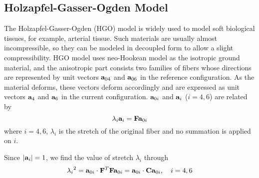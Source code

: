 \subsection{Holzapfel-Gasser-Ogden Model}
The Holzapfel-Gasser-Ogden (HGO) model is widely used to model soft biological tissues, for example, arterial tissue. Such materials are usually almost incompressible, so they can be modeled in decoupled form to allow a slight compressibility. HGO model uses neo-Hookean model as the isotropic ground material, and the anisotropic part consists two families of fibers whose directions are represented by unit vectors $\bold{a}_{04}$ and $\bold{a}_{06}$ in the reference configuration. As the material deforms, these vectors deform accordingly and are expressed as unit vectors $\bold{a}_4$ and $\bold{a}_6$ in the current configuration. $\bold{a}_{0i}$ and $\bold{a}_{i}$ ($i = 4, 6$) are related by 
\begin{equation} \label{vector}
\lambda_i\bold{a}_i = \bold{F}\bold{a}_{0i}
\end{equation} 
where $i = 4, 6$, $\lambda_i$ is the stretch of the original fiber and no summation is applied on $i$.

Since $|\bold{a}_i| = 1$, we find the value of stretch $\lambda_i$ through
\begin{equation}
{\lambda_i}^2 = \bold{a}_{0i} \cdot \bold{F}^T\bold{F}\bold{a}_{0i} = \bold{a}_{0i} \cdot \bold{C}\bold{a}_{0i}, \quad i = 4, 6
\end{equation}

